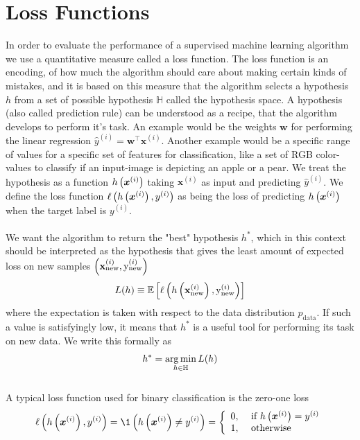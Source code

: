\section{Loss Functions} \label{sec:loss_func}
In order to evaluate the performance of a supervised machine learning algorithm we use a quantitative measure called a loss function. The loss function is an encoding, of how much the algorithm should care about making certain kinds of mistakes, and it is based on this measure that the algorithm selects a hypothesis $h$ from a set of possible hypothesis $\mathbb{H}$ called the hypothesis space. A hypothesis (also called prediction rule) can be understood as a recipe, that the algorithm develops to perform it's task. An example would be the weights $\boldsymbol{w}$ for performing the linear regression $\hat{y}^{(i)} = \boldsymbol{w}^\top \boldsymbol{x}^{(i)}$. Another example would be a specific range of values for a specific set of features for classification, like a set of RGB color-values to classify if an input-image is depicting an apple or a pear. We treat the hypothesis as a function $h\left (\boldsymbol{x}^{(i)}\right)$ taking $\boldsymbol{x}^{(i)}$ as input and predicting $\hat{y}^{(i)}$. We define the loss function $\ell \left (h \left (\boldsymbol{x}^{(i)}\right), y^{(i)}\right)$ as being the loss of predicting $h \left (\boldsymbol{x}^{(i)}\right)$ when the target label is $y^{(i)}$.\\ 
\\
We want the algorithm to return the "best" hypothesis $h^*$, which in this context should be interpreted as the hypothesis that gives the least amount of expected loss on new samples $\left (\mathbf{x}^{(i)}_{\text{new}}, \text{y}^{(i)}_{\text{new}}\right)$
\begin{equation*}
    L(h) \equiv \E \lrs{\ell \lr{h \lr{\mathbf{x}_{\text{new}}^{(i)}}, \text{y}_{\text{new}}^{(i)}}}
\end{equation*}
where the expectation is taken with respect to the data distribution $p_{\text{data}}$. If such a value is satisfyingly low, it means that $h^*$ is a useful tool for performing its task on new data. We write this formally as
\begin{equation*}
   h^* = \operatorname*{arg\,min}_{h \in \mathbb{H}} L(h)
\end{equation*}
\\
A typical loss function used for binary classification is the zero-one loss 
$$ \ell\left(h\lr{\boldsymbol{x}^{(i)}}, y^{(i)}\right)=\1\left(h\lr{\boldsymbol{x}^{(i)}} \neq y^{(i)} \right)=\left\{\begin{array}{ll}
0, & \text { if } h\lr{\boldsymbol{x}^{(i)}}=y^{(i)} \\
1, & \text { otherwise }
\end{array}\right. $$
